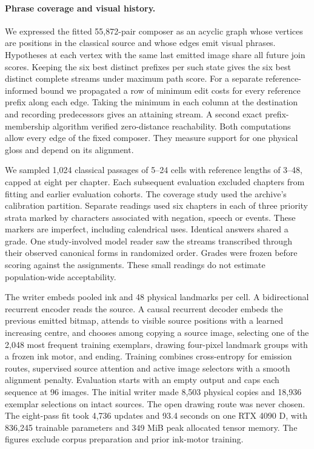 \paragraph{Phrase coverage and visual history.}
We expressed the fitted 55,872-pair composer as an acyclic graph whose vertices are positions in the classical source and whose edges emit visual phrases. Hypotheses at each vertex with the same last emitted image share all future join scores. Keeping the six best distinct prefixes per such state gives the six best distinct complete streams under maximum path score. For a separate reference-informed bound we propagated a row of minimum edit costs for every reference prefix along each edge. Taking the minimum in each column at the destination and recording predecessors gives an attaining stream. A second exact prefix-membership algorithm verified zero-distance reachability. Both computations allow every edge of the fixed composer. They measure support for one physical gloss and depend on its alignment.

We sampled 1,024 classical passages of 5--24 cells with reference lengths of 3--48, capped at eight per chapter. Each subsequent evaluation excluded chapters from fitting and earlier evaluation cohorts. The coverage study used the archive's calibration partition. Separate readings used six chapters in each of three priority strata marked by characters associated with negation, speech or events. These markers are imperfect, including calendrical uses. Identical answers shared a grade. One study-involved model reader saw the streams transcribed through their observed canonical forms in randomized order. Grades were frozen before scoring against the assignments. These small readings do not estimate population-wide acceptability.

The writer embeds pooled ink and 48 physical landmarks per cell. A bidirectional recurrent encoder reads the source. A causal recurrent decoder embeds the previous emitted bitmap, attends to visible source positions with a learned increasing centre, and chooses among copying a source image, selecting one of the 2,048 most frequent training exemplars, drawing four-pixel landmark groups with a frozen ink motor, and ending. Training combines cross-entropy for emission routes, supervised source attention and active image selectors with a smooth alignment penalty. Evaluation starts with an empty output and caps each sequence at 96 images. The initial writer made 8,503 physical copies and 18,936 exemplar selections on intact sources. The open drawing route was never chosen. The eight-pass fit took 4,736 updates and 93.4 seconds on one RTX 4090 D, with 836,245 trainable parameters and 349 MiB peak allocated tensor memory. The figures exclude corpus preparation and prior ink-motor training.

